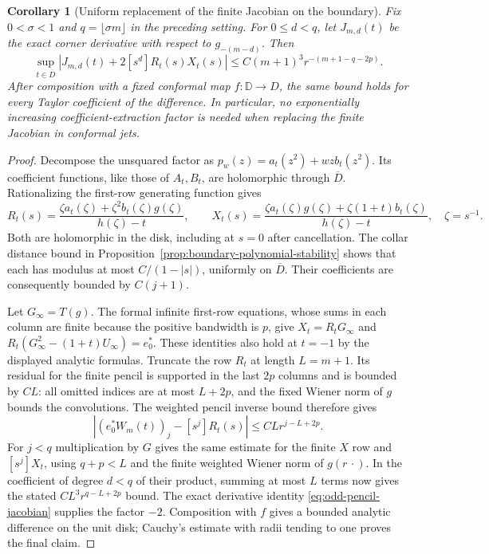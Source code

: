 \documentclass[11pt]{article}
\newtheorem{corollary}[proposition]{Corollary}
\begin{document}
\begin{corollary}[Uniform replacement of the finite Jacobian on the boundary]
\label{cor:boundary-jacobian-replacement}
Fix $0<\sigma<1$ and $q=\lfloor\sigma m\rfloor$ in the preceding
setting. For $0\le d<q$, let $J_{m,d}(t)$ be the exact corner
derivative with respect to $g_{-(m-d)}$. Then
\[
 \sup_{t\in\overline D}
 \left|J_{m,d}(t)+2[s^d]R_t(s)X_t(s)\right|
 \le C(m+1)^3r^{-(m+1-q-2p)}.
\]
After composition with a fixed conformal map $f:\mathbb D\to D$,
the same bound holds for every Taylor coefficient of the difference.
In particular, no exponentially increasing coefficient-extraction
factor is needed when replacing the finite Jacobian in conformal jets.
\end{corollary}
\begin{proof}
Decompose the unsquared factor as
$p_w(z)=a_t(z^2)+wzb_t(z^2)$. Its coefficient functions, like those
of $A_t,B_t$, are holomorphic through $\overline D$.
Rationalizing the first-row generating function gives
\[
 R_t(s)=\frac{\zeta a_t(\zeta)+\zeta^2b_t(\zeta)g(\zeta)}
                 {h(\zeta)-t},\qquad
 X_t(s)=\frac{\zeta a_t(\zeta)g(\zeta)
                         +\zeta(1+t)b_t(\zeta)}{h(\zeta)-t},
 \quad \zeta=s^{-1}.
\]
Both are holomorphic in the disk, including at $s=0$ after
cancellation. The collar distance bound in Proposition~\ref{prop:boundary-polynomial-stability}
shows that each has modulus at most $C/(1-|s|)$, uniformly on
$\overline D$. Their coefficients are consequently bounded by $C(j+1)$.

Let $G_\infty=T(g)$. The formal infinite first-row equations, whose
sums in each column are finite because the positive bandwidth is $p$,
give $X_t=R_tG_\infty$ and
$R_t(G_\infty^2-(1+t)U_\infty)=e_0^*$.
These identities also hold at $t=-1$ by the displayed analytic formulas.
Truncate the row $R_t$ at length $L=m+1$. Its residual for the
finite pencil is supported in the last $2p$ columns and is bounded
by $CL$: all omitted indices are at most $L+2p$, and the fixed
Wiener norm of $g$ bounds the convolutions. The weighted pencil
inverse bound therefore gives
\[
 |(e_0^*W_m(t))_j-[s^j]R_t(s)|
       \le CLr^{j-L+2p}.
\]
For $j<q$ multiplication by $G$ gives the same estimate for the
finite $X$ row and $[s^j]X_t$, using $q+p<L$ and the finite
weighted Wiener norm of $g(r\,\cdot)$. In the coefficient of
degree $d<q$ of their product, summing at most $L$ terms now gives
the stated $CL^3r^{q-L+2p}$ bound. The exact derivative identity
\eqref{eq:odd-pencil-jacobian} supplies the factor $-2$.
Composition with $f$ gives a bounded analytic difference on the unit
disk; Cauchy's estimate with radii tending to one proves the final claim.
\end{proof}
\end{document}

